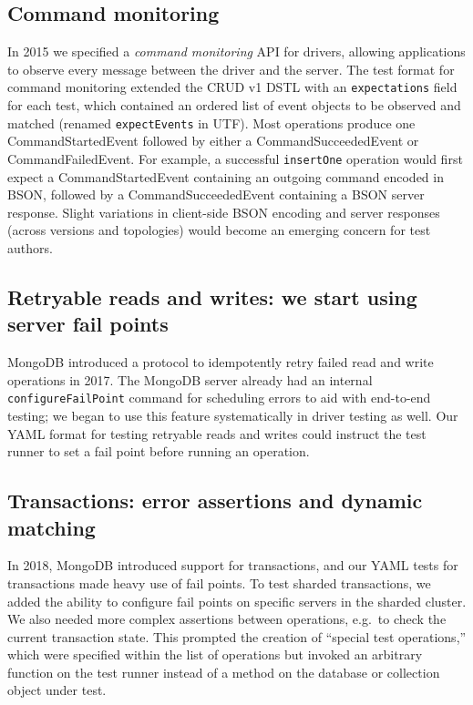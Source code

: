 \documentclass[conference]{IEEEtran}
\begin{document}
\subsection{Command monitoring}

In 2015 we specified a \textit{command monitoring} API for drivers, allowing applications to observe every message between the driver and the server. The test format for command monitoring extended the CRUD v1 DSTL with an \texttt{expectations} field for each test, which contained an ordered list of event objects to be observed and matched (renamed \texttt{expectEvents} in UTF). Most operations produce one CommandStartedEvent followed by either a CommandSucceededEvent or CommandFailedEvent. For example, a successful \texttt{insertOne} operation would first expect a CommandStartedEvent containing an outgoing command encoded in BSON, followed by a CommandSucceededEvent containing a BSON server response.
Slight variations in client-side BSON encoding and server responses (across versions and topologies) would become an emerging concern for test authors.

\subsection{Retryable reads and writes: we start using server fail points}

MongoDB introduced a protocol to idempotently retry failed read and write operations in 2017. The MongoDB server already had an internal \texttt{configureFailPoint} command for scheduling errors to aid with end-to-end testing; we began to use this feature systematically in driver testing as well. Our YAML format for testing retryable reads and writes could instruct the test runner to set a fail point before running an operation.

\subsection{Transactions: error assertions and dynamic matching}

In 2018, MongoDB introduced support for transactions, and our YAML tests for transactions made heavy use of fail points. To test sharded transactions, we added the ability to configure fail points on specific servers in the sharded cluster. We also needed more complex assertions between operations, e.g.\ to check the current transaction state. This prompted the creation of ``special test operations,'' which were specified within the list of operations but invoked an arbitrary function on the test runner instead of a method on the database or collection object under test.
\end{document}
